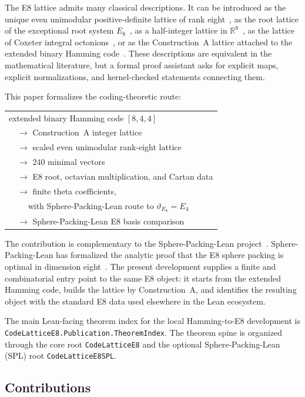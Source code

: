 \documentclass[12pt]{article}
\theoremstyle{definition}
\newcommand{\R}{\mathbb{R}}
\newcommand{\code}[1]{\texttt{#1}}
\newcommand{\Theta}{\vartheta}
\begin{document}
The E8 lattice admits many classical descriptions.  It can be introduced as
the unique even unimodular positive-definite lattice of rank eight~\cite{ConwaySloane1999},
as the root lattice of the exceptional root system $E_8$~\cite{Bourbaki2002},
as a half-integer lattice in $\R^8$~\cite{ConwaySloane1999}, as the lattice of
Coxeter integral octonions~\cite{Coxeter1946,Baez2002}, or as the
Construction~A lattice attached to the extended binary Hamming
code~\cite{LeechSloane1971,ConwaySloane1999}.  These descriptions are equivalent
in the mathematical literature, but a formal proof assistant asks for explicit
maps, explicit normalizations, and kernel-checked statements connecting them.

This paper formalizes the coding-theoretic route:
\begin{center}
\begin{tabular}{l}
extended binary Hamming code $[8,4,4]$ \\
$\quad\to$ Construction~A integer lattice \\
$\quad\to$ scaled even unimodular rank-eight lattice \\
$\quad\to$ $240$ minimal vectors \\
$\quad\to$ E8 root, octavian multiplication, and Cartan data \\
$\quad\to$ finite theta coefficients,\\
$\quad\quad$ with Sphere-Packing-Lean route to $\Theta_{E_8} = E_4$ \\
$\quad\to$ Sphere-Packing-Lean E8 basis comparison
\end{tabular}
\end{center}

The contribution is complementary to the Sphere-Packing-Lean project~\cite{SPL2025}.
Sphere-Packing-Lean has formalized the analytic proof that the E8 sphere packing
is optimal in dimension eight~\cite{Viazovska2017}.  The present development
supplies a finite and combinatorial entry point to the same E8 object: it starts
from the extended Hamming code, builds the lattice by Construction~A, and
identifies the resulting object with the standard E8 data used elsewhere in
the Lean ecosystem.

The main Lean-facing theorem index for the local Hamming-to-E8 development is
\code{CodeLatticeE8.Publication.TheoremIndex}.  The theorem spine is
organized through the core root \code{CodeLatticeE8} and the optional
Sphere-Packing-Lean (SPL) root \code{CodeLatticeE8SPL}.

\subsection{Contributions}
\end{document}
